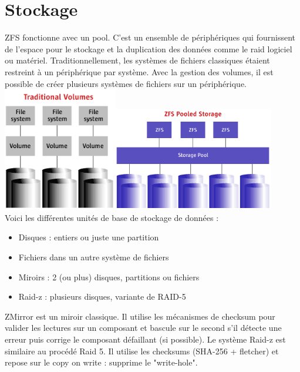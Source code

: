 \documentclass[a4paper]{report}
\begin{document}
	\section{Stockage}
	ZFS fonctionne avec un pool. C'est un ensemble de périphériques qui fournissent de l’espace pour le stockage et la duplication des données comme le raid logiciel ou matériel. Traditionnellement, les systèmes de fichiers classiques étaient restreint à un périphérique par système. Avec la gestion des volumes, il est possible de créer plusieurs systèmes de fichiers sur un périphérique.\\
	\includegraphics[width=5cm]{img/volumes_tradicionais.png}\includegraphics[width=7cm]{img/armazenamento_pooled_zfs.png}\\

	Voici les différentes unités de base de stockage de données :\\
	\begin{itemize}
		 \item Disques : entiers ou juste une partition
		 \item Fichiers dans un autre système de fichiers
		 \item Miroirs : 2 (ou plus) disques, partitions ou fichiers
		 \item Raid-z : plusieurs disques, variante de RAID-5\\
	\end{itemize}
	ZMirror est un miroir classique. Il utilise les mécanismes de checksum pour valider les lectures sur un composant et bascule sur le second s'il détecte une erreur puis corrige le composant défaillant (si possible). Le système Raid-z est similaire au procédé Raid 5. Il utilise les checksums (SHA-256 + fletcher) et repose sur le copy on write : supprime le "write-hole".
\end{document}
